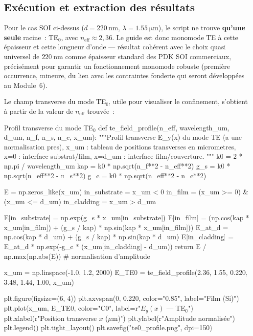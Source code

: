 \subsection{Exécution et extraction des résultats}

Pour le cas SOI ci-dessus ($d=\SI{220}{\nano\metre}$,
$\lambda=\SI{1.55}{\micro\metre}$), le script ne trouve \textbf{qu'une
seule} racine~: TE$_0$, avec $n_{\text{eff}} \approx 2{,}36$. Le guide est
donc monomode TE à cette épaisseur et cette longueur d'onde — résultat
cohérent avec le choix quasi universel de $\SI{220}{\nano\metre}$ comme
épaisseur standard des PDK SOI commerciaux, précisément pour garantir un
fonctionnement monomode robuste (première occurrence, mineure, du lien
avec les contraintes fonderie qui seront développées au Module~6).

Le champ transverse du mode TE$_0$, utile pour visualiser le confinement,
s'obtient à partir de la valeur de $n_{\text{eff}}$ trouvée~:
\begin{coursecode}[language=Python]{Profil transverse du mode TE$_0$}
def te_field_profile(n_eff, wavelength_um, d_um, n_f, n_s, n_c, x_um):
    """Profil transverse E_y(x) du mode TE (a une normalisation pres),
    x_um : tableau de positions transverses en micrometres,
    x=0 : interface substrat/film, x=d_um : interface film/couverture.
    """
    k0 = 2 * np.pi / wavelength_um
    kap = k0 * np.sqrt(n_f**2 - n_eff**2)
    g_s = k0 * np.sqrt(n_eff**2 - n_s**2)
    g_c = k0 * np.sqrt(n_eff**2 - n_c**2)

    E = np.zeros_like(x_um)
    in_substrate = x_um < 0
    in_film = (x_um >= 0) & (x_um <= d_um)
    in_cladding = x_um > d_um

    E[in_substrate] = np.exp(g_s * x_um[in_substrate])
    E[in_film] = (np.cos(kap * x_um[in_film])
                  + (g_s / kap) * np.sin(kap * x_um[in_film]))
    E_at_d = np.cos(kap * d_um) + (g_s / kap) * np.sin(kap * d_um)
    E[in_cladding] = E_at_d * np.exp(-g_c * (x_um[in_cladding] - d_um))
    return E / np.max(np.abs(E))  # normalisation d'amplitude


x_um = np.linspace(-1.0, 1.2, 2000)
E_TE0 = te_field_profile(2.36, 1.55, 0.220, 3.48, 1.44, 1.00, x_um)

plt.figure(figsize=(6, 4))
plt.axvspan(0, 0.220, color="0.85", label="Film (Si)")
plt.plot(x_um, E_TE0, color="C0", label=r"$E_y(x)$ — TE$_0$")
plt.xlabel(r"Position transverse $x$ ($\mu$m)")
plt.ylabel(r"Amplitude normalisée")
plt.legend()
plt.tight_layout()
plt.savefig("te0_profile.png", dpi=150)
\end{coursecode}

